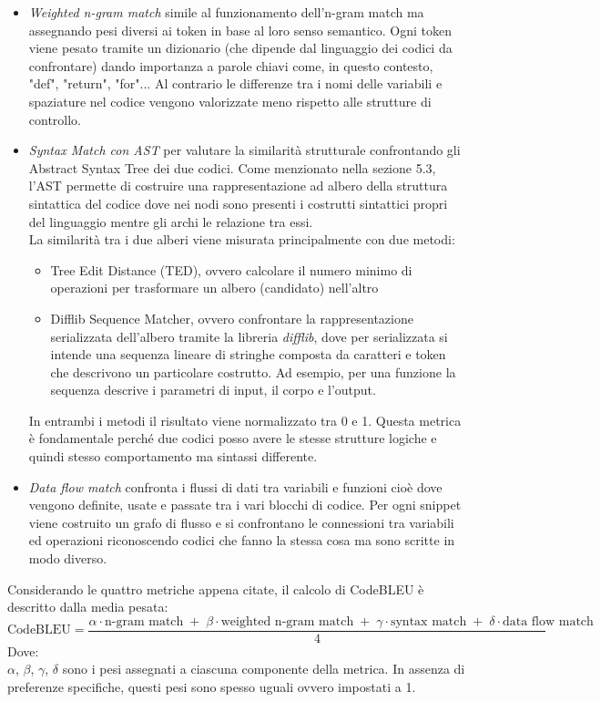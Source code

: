 \documentclass{article}
\begin{document}
\begin{itemize}
\begin{itemize}
        \item \textit{Weighted n-gram match} simile al funzionamento dell'n-gram match ma assegnando pesi diversi ai token in base al loro senso semantico. Ogni token viene pesato tramite un dizionario (che dipende dal linguaggio dei codici da confrontare) dando importanza a parole chiavi come, in questo contesto, "def", "return", "for"...
        Al contrario le differenze tra i nomi delle variabili e spaziature nel codice vengono valorizzate meno rispetto alle strutture di controllo.

        \item \textit{Syntax Match con AST} per valutare la similarità strutturale confrontando gli Abstract Syntax Tree dei due codici. Come menzionato nella sezione 5.3, l'AST permette di costruire una rappresentazione ad albero della struttura sintattica del codice dove nei nodi sono presenti i costrutti sintattici propri del linguaggio mentre gli archi le relazione tra essi.\\
        La similarità tra i due alberi viene misurata principalmente con due metodi:
        \begin{itemize}
            \item Tree Edit Distance (TED), ovvero calcolare il numero minimo di operazioni per trasformare un albero (candidato) nell’altro
            \item Difflib Sequence Matcher, ovvero confrontare la rappresentazione serializzata dell'albero tramite la libreria \textit{difflib}, dove per serializzata si intende una sequenza lineare di stringhe composta da caratteri e token che descrivono un particolare costrutto. Ad esempio, per una funzione la sequenza descrive i parametri di input, il corpo e l'output.
        \end{itemize}
        In entrambi i metodi il risultato viene normalizzato tra 0 e 1. Questa metrica è fondamentale perché due codici posso avere le stesse strutture logiche e quindi stesso comportamento ma sintassi differente.

        \item \textit{Data flow match} confronta i flussi di dati tra variabili e funzioni cioè dove vengono definite, usate e passate tra i vari blocchi di codice. Per ogni snippet viene costruito un grafo di flusso e si confrontano le connessioni tra variabili ed operazioni riconoscendo codici che fanno la stessa cosa ma sono scritte in modo diverso.
        
    \end{itemize}
    Considerando le quattro metriche appena citate, il calcolo di CodeBLEU è descritto dalla media pesata:
    \[
        \text{CodeBLEU} = \frac{\alpha \cdot \text{n-gram match} \;+\; \beta \cdot \text{weighted n-gram match} \;+\; \gamma \cdot \text{syntax match} \;+\; \delta \cdot \text{data flow match}}{4}
    \]
    Dove:\\
    $\alpha$, $\beta$, $\gamma$, $\delta$ sono i pesi assegnati a ciascuna componente della metrica. In assenza di preferenze specifiche, questi pesi sono spesso uguali ovvero impostati a 1.\\
    

\end{itemize}
\end{document}
